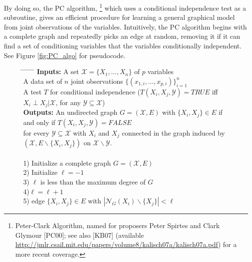 \documentclass[twoside]{article}
\renewcommand{\cite}[1]{[#1]}
\newcommand\X{\mathcal{X}}
\newcommand\Y{\mathcal{Y}}
\newcommand\sminus{\backslash}
\newcommand\nbr{\mathcal{N}}
\begin{document}
By doing so, the PC algorithm,
\footnote{Peter-Clark Algorithm, named for proposers Peter Spirtes and Clark
Glymour \cite{PC00}; see also \cite{KB07} (available
\url{http://jmlr.csail.mit.edu/papers/volume8/kalisch07a/kalisch07a.pdf}) for a
more recent coverage.}
which uses a conditional independence test as a subroutine, gives an efficient
procedure for learning a general graphical model from joint observations of the
variables. Intuitively, the PC algorithm begins with a complete graph and
repeatedly picks an edge at random, removing it if it can find a set of
conditioning variables that the variables conditionally independent. See Figure
\ref{fig:PC_algo} for pseudocode.

\newpage
\begin{figure}
\begin{tabbing}
\hspace*{.15in} \= \hspace*{.15in} \= \hspace*{.15in} \= \hspace*{.15in} \= \hspace*{.15in} \= \hspace*{.15in} \=\kill
{\bf Inputs:}
\>\>\>\hspace{2mm}A set $\X = \{X_1,\dots,X_n\}$ of $p$ variables   \\
\>\>\>\hspace{2mm}A data set of $n$ joint observations
    $\{(x_{1,i},\dots,x_{p,i})\}_{i = 1}^n$ \\
\>\>\>\hspace{2mm}A test $T$ for conditional independence ($T(X_i,X_j,\Y) = TRUE$ iff
$X_i \perp X_j | \X$, for any $\Y \subseteq \X$) \\
{\bf Outputs:} An undirected graph $G = (\X,E)$ with $\{X_i,X_j\} \in E$ if and
only if $T(X_i,X_j,\Y) = FALSE$ \\
\>\>for every $\Y \subseteq \X$ with $X_i$ and $X_j$ connected in the graph
induced by $(\X,E\sminus\{X_i,X_j\})$ on $\X \sminus \Y$. \\\\ 
1) Initialize a complete graph $G = (\X,E)$ \\
2) Initialize $\ell = -1$   \\
3) $\ell$ is less than the maximum degree of $G$ \\
4)\>\>$\ell = \ell + 1$   \\
5)\> edge $\{X_i,X_j\} \in E$ with
                                    $|\nbr_G(X_i) \sminus \{X_j\}| < \ell$  \\

\end{tabbing}
\end{figure}
\end{document}
